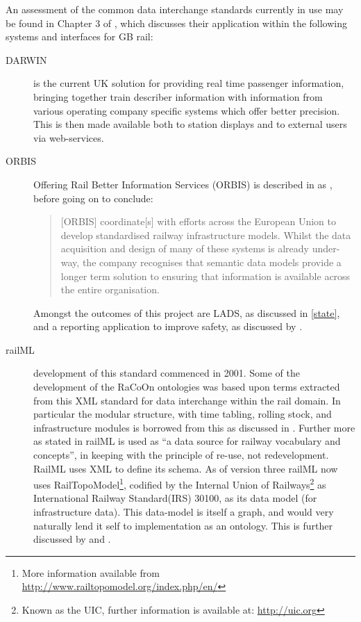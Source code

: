 An assessment of the common data interchange standards currently in use may be found in Chapter 3 of \citet{Tutcher2015}, which discusses their application within the following systems and interfaces for GB rail:
\begin{description}
    \item[DARWIN] is the current UK solution for providing real time passenger information, bringing together train describer information with information from various operating company specific systems which offer better precision. This is then made available both to station displays and to external users via web-services.
    \item[ORBIS] Offering Rail Better Information Services (ORBIS) is described in \citet{Tutcher2015}  as , before going on to conclude: 
    \begin{quote}
       [ORBIS] coordinate[s] with efforts across the European Union to develop standardised railway infrastructure models. Whilst the data acquisition and design of many of these systems is already under-way, the company recognises that semantic data models provide a longer term solution to ensuring that information is available across the entire organisation.
    \end{quote}
    Amongst the outcomes of this project are LADS, as discussed in \autoref{state}, and a  reporting application to improve safety, as discussed by \citet{Rail}.
    \item[railML] development of this standard commenced in 2001. Some of the development of the RaCoOn ontologies was based upon terms extracted from this XML standard for data interchange within the rail domain. In particular the modular structure, with time tabling, rolling stock, and infrastructure modules is borrowed from this as discussed in \citet{Tutcher2015}. Further more as stated in \citet{Tutcher2015} railML is used as ``a data source for railway vocabulary and concepts'', in keeping with the principle of re-use, not redevelopment. RailML uses XML to define its schema. As of version three railML now uses RailTopoModel\footnote{More information available from \url{http://www.railtopomodel.org/index.php/en/}}, codified by the Internal Union of Railways\footnote{Known as the UIC, further information is available at: \url{http://uic.org} } as International Railway Standard(IRS) 30100, as its data model (for infrastructure data). This data-model is itself a graph, and would very naturally lend it self to implementation as an ontology. This is further discussed by \citet{Nash2010} and \cite{RailML.org}.


\end{description}

